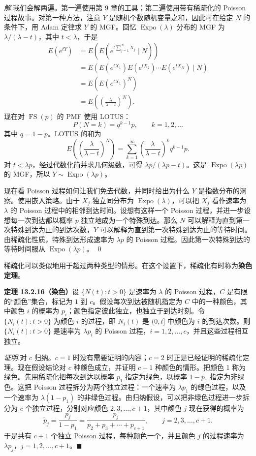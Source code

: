 \documentclass[UTF8, 12pt, fontset=fandol, oneside]{ctexart}
\begin{document}
\noindent\textit{解.}\quad 我们会解两遍。第一遍使用第 9 章的工具；第二遍使用带有稀疏化的 Poisson 过程故事。对第一种方法，注意 $Y$ 是随机个数随机变量之和，因此可在给定 $N$ 的条件下，用 Adam 定律求 $Y$ 的 MGF。回忆 $\operatorname{Expo}(\lambda)$ 分布的 MGF 为 $\lambda/(\lambda-t)$，其中 $t<\lambda$，于是
\[
\begin{aligned}
  E(e^{tY})
  &=E\left(E\left(e^{t\sum_{j=1}^{N}X_j}\mid N\right)\right)\\
  &=E\left(E(e^{tX_1})E(e^{tX_2})\cdots E(e^{tX_N})\mid N\right)\\
  &=E\left(E(e^{tX_1})^N\right)\\
  &=E\left(\left(\frac{\lambda}{\lambda-t}\right)^N\right).
\end{aligned}
\]
现在对 $\operatorname{FS}(p)$ 的 PMF 使用 LOTUS：
\[
  P(N=k)=q^{k-1}p,\qquad k=1,2,\ldots
\]
其中 $q=1-p$。LOTUS 的和为
\[
  E\left(\left(\frac{\lambda}{\lambda-t}\right)^N\right)
  =
  \sum_{k=1}^{\infty}
  \left(\frac{\lambda}{\lambda-t}\right)^kq^{k-1}p.
\]
对 $t<\lambda p$，经过代数化简并求几何级数，可得 $\lambda p/(\lambda p-t)$。这是 $\operatorname{Expo}(\lambda p)$ 的 MGF，所以 $Y\sim\operatorname{Expo}(\lambda p)$。

现在看 Poisson 过程如何让我们免去代数，并同时给出为什么 $Y$ 是指数分布的洞察。使用嵌入策略。由于 $X_j$ 独立同分布为 $\operatorname{Expo}(\lambda)$，可以把 $X_j$ 看作速率为 $\lambda$ 的 Poisson 过程中的相邻到达时间。设想有这样一个 Poisson 过程，并进一步设想每一次到达都以概率 $p$ 独立地成为一个特殊到达。那么 $N$ 可以解释为直到第一次特殊到达为止的到达次数，$Y$ 可以解释为直到第一次特殊到达为止的等待时间。由稀疏化性质，特殊到达形成速率为 $\lambda p$ 的 Poisson 过程。因此第一次特殊到达的等待时间服从 $\operatorname{Expo}(\lambda p)$。 \qed

稀疏化可以类似地用于超过两种类型的情形。在这个设置下，稀疏化有时称为\textbf{染色定理}。

\noindent\textbf{定理 13.2.16（染色）}\quad 设 $\{N(t):t>0\}$ 是速率为 $\lambda$ 的 Poisson 过程，$C$ 是有限的“颜色”集合，标记为 $1$ 到 $c$。假设每次到达被随机指定为 $C$ 中的一种颜色，其中颜色 $i$ 的概率为 $p_i$；颜色指定彼此独立，也独立于到达时刻。令 $\{N_i(t):t>0\}$ 为颜色 $i$ 的过程，即 $N_i(t)$ 是 $(0,t]$ 中颜色为 $i$ 的到达次数。则 $\{N_i(t):t>0\}$ 是速率为 $\lambda p_i$ 的 Poisson 过程，$i=1,2,\ldots,c$，并且这些过程相互独立。

\noindent\textit{证明.}\quad 对 $c$ 归纳。$c=1$ 时没有需要证明的内容；$c=2$ 时正是已经证明的稀疏化定理。现在假设结论对 $c$ 种颜色成立，并证明 $c+1$ 种颜色的情形。把颜色 1 称为绿色。先用稀疏化把每次到达以概率 $p_1$ 指定为绿色，以概率 $1-p_1$ 指定为非绿色。这把 Poisson 过程拆分为两个独立过程：一个速率为 $\lambda p_1$ 的绿色过程，以及一个速率为 $\lambda(1-p_1)$ 的非绿色过程。由归纳假设，可以把非绿色过程进一步拆分为 $c$ 个独立过程，分别对应颜色 $2,3,\ldots,c+1$，其中颜色 $j$ 现在获得的概率为
\[
  \tilde p_j=\frac{p_j}{1-p_1}
  =
  \frac{p_j}{p_2+p_3+\cdots+p_{c+1}},
  \qquad j=2,3,\ldots,c+1.
\]
于是共有 $c+1$ 个独立 Poisson 过程，每种颜色一个，并且颜色 $j$ 的过程速率为 $\lambda p_j$，$j=1,2,\ldots,c+1$。$\blacksquare$
\end{document}
